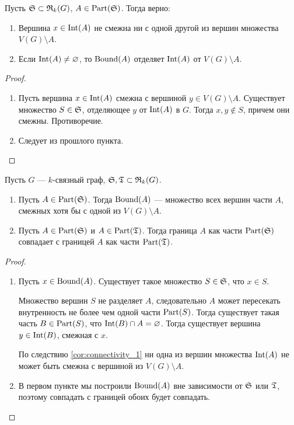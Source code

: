 \begin{lemma}\label{lm:connectivity_5}
    Пусть $\S \subset \RR_k(G)$, $A \in \Part(\S)$. Тогда верно:
	\begin{enumerate}
	    \item  Вершина $x \in \Int(A)$ не смежна ни с одной другой из вершин множества $V(G)\setminus A$.
		\item Если $\Int(A) \neq \varnothing$, то $\Bound(A)$ отделяет $\Int(A)$ от $V(G) \setminus A$.
	\end{enumerate}
\end{lemma}
\begin{proof}
    \begin{enumerate}
		\item Пусть вершина $x \in  \Int(A)$ смежна с вершиной $y \in V(G) \setminus A$. Существует множество $S \in \S$, отделяющее $ y$ от $\Int(A)$ в $G$. Тогда $x, y \notin S$, причем они смежны. Противоречие. 
		\item Следует из прошлого пункта.
    \end{enumerate}
\end{proof}

\begin{theorem}
    Пусть $G$ --- $k$-связный граф, $\S, \T \subset\RR_k(G)$.
	\begin{enumerate}
		\item Пусть $A \in  \Part(\S)$. Тогда $\Bound(A)$ --- множество всех вершин части $A$, смежных хотя бы с одной из $V(G) \setminus A$.
		\item Пусть $A \in \Part(\S)$ и $A \in \Part(\T)$. Тогда граница $A$ как части $\Part(\S)$ совпадает с границей $A$ как части $\Part(\T)$.
	\end{enumerate}
\end{theorem}
\begin{proof}
    \begin{enumerate}
		\item Пусть  $x \in \Bound(A)$. Существует такое множество $S \in \S$, что $x \in S$.

			Множество вершин $S$ не разделяет $A$, следовательно $A$ может пересекать внутренность не более чем одной части $\Part(S)$. Тогда существует такая часть $B \in \Part(S)$, что $\Int(B) \cap A = \varnothing$. Тогда существует вершина $y \in \Int(B)$, смежная с $x$.  

			По следствию \ref{cor:connectivity_1} ни одна из вершин множества $\Int(A)$ не может быть смежна с вершиной из $V(G) \setminus A$.
		\item  В первом пункте мы построили $\Bound(A)$ вне зависимости от $\S$ или $\T$, поэтому совпадать с границей обоих будет совпадать.
    \end{enumerate}
\end{proof}
